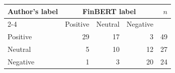 \begin{tabular}{lrrrr}
\toprule
Author's label & \multicolumn{3}{c}{FinBERT label} & $n$\\
\cmidrule(lr){2-4}
 & Positive & Neutral & Negative & \\
\midrule
Positive & 29 & 17 & 3 & 49\\
Neutral & 5 & 10 & 12 & 27\\
Negative & 1 & 3 & 20 & 24\\
\bottomrule
\end{tabular}
